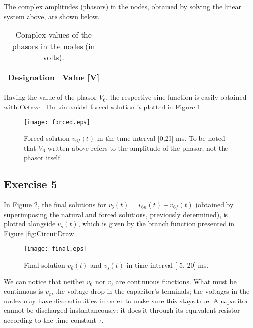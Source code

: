 The complex amplitudes (phasors) in the nodes, obtained by solving the linear system above, are shown below.
\vspace{-3mm}
\begin{table}[H]
  \centering
  \begin{tabular}{|c|c|}
    \hline
        {\bf Designation} & {\bf Value [V]} \\ \hline
        
  \end{tabular}
  \caption{Complex values of the phasors in the nodes (in volts).}
  \label{tab:Exercise4Theoretical}
\end{table}
\vspace{-4mm}
Having the value of the phasor $V_6$, the respective sine function is easily obtained with Octave. The sinusoidal forced solution is plotted in Figure \ref{fig:ForcedSolutionGraph}.

\begin{figure}[H]
  \centering
  \texttt{[image: forced.eps]}
  \caption{Forced solution $v_{6f}(t)$ in the time interval [0,20] ms. To be noted that $V_6$ written above refers to the amplitude of the phasor, not the phasor itself.}
  \label{fig:ForcedSolutionGraph}
\end{figure}

\subsection{Exercise 5} \label{sec:Ex5Theo}

In Figure \ref{fig:final}, the final solutions for $v_6 (t)=v_{6n}(t)+v_{6f}(t)$ (obtained by superimposing the natural and forced solutions, previously determined), is plotted alongside $v_s(t)$, which is given by the branch function presented in Figure \ref{fig:CircuitDraw}.


\begin{figure}[H] \centering
  \texttt{[image: final.eps]}
  \caption{Final solution $v_6(t)$ and $v_s(t)$ in time interval [-5, 20] ms.}
  \label{fig:final}
\end{figure}

We can notice that neither $v_6$ nor $v_s$ are continuous functions. What must be continuous is $v_c$, the voltage drop in the capacitor's terminals; the voltages in the nodes may have discontinuities in order to make sure this stays true. A capacitor cannot be discharged instantaneously: it does it through its equivalent resistor according to the time constant $\tau$.



